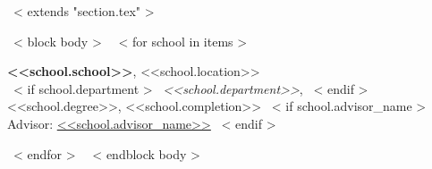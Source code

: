 ~< extends "section.tex" >~

~< block body >~
~< for school in items >~

  {\bf <<school.school>>}, <<school.location>> \\
  ~< if school.department >~ {\em <<school.department>>}, ~< endif >~ <<school.degree>>, <<school.completion>>
  ~< if school.advisor_name >~
    \\
    Advisor: \href{<<school.advisor_website>>}{\color{links}<<school.advisor_name>>}
  ~< endif >~

~< endfor >~
~< endblock body >~
